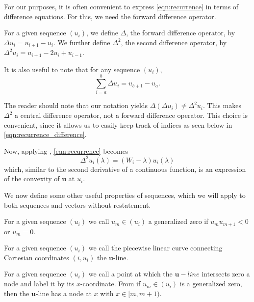     For our purposes, it is often convenient to express \cref{eqn:recurrence} in terms of difference equations. For this, we need the forward difference operator.
    \begin{definition}\label{def:forward_difference}
      For a given sequence $\left(u_i\right)$, we define $\Delta$, the forward difference operator, by $\Delta u_i = u_{i+1} - u_i$. We further define $\Delta^2$, the second difference operator, by $\Delta^2 u_i = u_{i+1} - 2 u_i + u_{i-1}$.
    \end{definition}
       It is also useful to note that for any sequence $(u_i)$,
      \begin{equation}\label{eqn:forward_sum}
	\sum_{i=a}^b \Delta u_i = u_{b+1} - u_a.
      \end{equation}

    \begin{remark}
      The reader should note that our notation yields $\Delta \left(\Delta u_i \right) \neq \Delta^2 u_i$. This makes $\Delta^2$ a central difference operator, not a forward difference operator. This choice is convenient, since it allows us to easily keep track of indices as seen below in \cref{eqn:recurrence_difference}.
    \end{remark}

    Now, applying , \cref{eqn:recurrence} becomes
    \begin{equation}\label{eqn:recurrence_difference}
      \Delta^2 u_i(\lambda) = (W_i - \lambda) u_i(\lambda)
    \end{equation}
    which, similar to the second derivative of a continuous function, is an expression of the convexity of $\mathbf{u}$ at $u_i$.

    We now define some other useful properties of sequences, which we will apply to both sequences and vectors without restatement.
    \begin{definition}\label{def:generalized_zero}
      For a given sequence $\left(u_i\right)$ we call $u_m \in \left(u_i\right)$ a generalized zero if $u_m u_{m+1} < 0$ or $u_m = 0$.
    \end{definition}
    \begin{definition}
      For a given sequence $(u_i)$ we call the piecewise linear curve connecting Cartesian coordinates $(i,u_i)$ the $\mathbf{u}$-line.
    \end{definition}
    \begin{definition}\label{def:node}
      For a given sequence $(u_i)$ we call a point at which the $\mathbf{u}-line$ intersects zero a node and label it by its $x$-coordinate. From  if $u_m \in (u_i)$ is a generalized zero, then the $\mathbf{u}$-line has a node at $x$ with $x\in[m,m+1)$.
    \end{definition}

